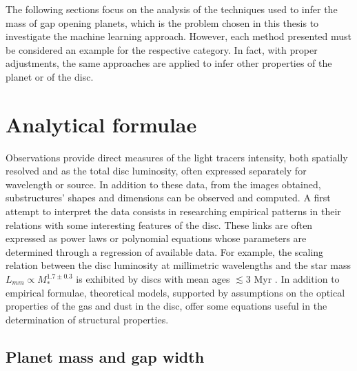 \documentclass[a4paper,10pt]{report}
\begin{document}
The following sections focus on the analysis of the
techniques used to infer the mass of gap opening planets, which is
the problem chosen in this thesis to investigate the machine learning approach.
However, each method presented must be considered an example for the respective category. 
In fact, with proper adjustments, the same approaches are
applied to infer other properties of the planet or of the disc.

\section{Analytical formulae}

Observations provide direct measures of the light tracers intensity, both spatially resolved and as
the total disc luminosity, often expressed separately for wavelength or source.
In addition to these data, from the images obtained, substructures' shapes and
dimensions can be observed and computed.
A first attempt to interpret the data consists in researching empirical patterns in their relations with some
interesting features of the disc. These links are often expressed as power laws or polynomial equations whose parameters are
determined through a regression of available data.
For example, the scaling relation between the disc luminosity at millimetric wavelengths and the star mass $L_{mm} \propto M_*^{1.7\pm0.3}$
is exhibited by discs with mean ages $\lesssim 3$ Myr \citep[p. 13]{disc_rev}.
In addition to empirical formulae, theoretical models, supported by assumptions on
the optical properties of the gas and dust in the disc, offer some equations useful
in the determination of structural properties.

\subsection{Planet mass and gap width}

\end{document}
